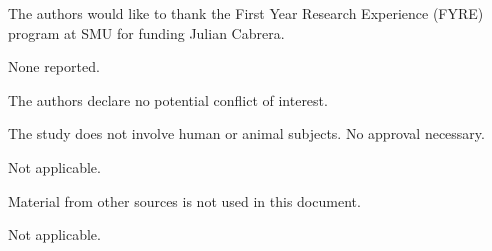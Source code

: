 \documentclass[APA,LATO2COL]{WileyNJDv5}
\begin{document}
The authors would like to thank the First Year Research Experience (FYRE) program at SMU for funding Julian Cabrera.


None reported.


The authors declare no potential conflict of interest.


The study does not involve human or animal subjects. No approval necessary.


Not applicable.


Material from other sources is not used in this document.



Not applicable.
\end{document}
